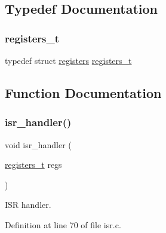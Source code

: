 \subsection{Typedef Documentation}
\mbox{\label{a00095_adf58dbaf6139b4957c348711f2026957_adf58dbaf6139b4957c348711f2026957}} 
\subsubsection{\texorpdfstring{registers\+\_\+t}{registers\_t}}
{\footnotesize\ttfamily typedef struct \hyperlink{a00202}{registers}  \hyperlink{a00095_adf58dbaf6139b4957c348711f2026957_adf58dbaf6139b4957c348711f2026957}{registers\+\_\+t}}



\subsection{Function Documentation}
\mbox{\label{a00095_a700e3ca056bf69296370f504f2cb6cc8_a700e3ca056bf69296370f504f2cb6cc8}} 
\subsubsection{\texorpdfstring{isr\+\_\+handler()}{isr\_handler()}}
{\footnotesize\ttfamily void isr\+\_\+handler (\begin{DoxyParamCaption}\item[{\hyperlink{a00095_adf58dbaf6139b4957c348711f2026957_adf58dbaf6139b4957c348711f2026957}{registers\+\_\+t}}]{regs }\end{DoxyParamCaption})}



I\+SR handler. 



Definition at line 70 of file isr.\+c.


